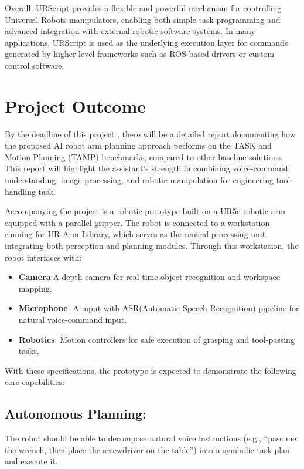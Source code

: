 \documentclass[12pt]{extarticle}
\begin{document}
Overall, URScript provides a flexible and powerful mechanism for controlling Universal Robots manipulators, enabling both simple task programming and advanced integration with external robotic software systems. In many applications, URScript is used as the underlying execution layer for commands generated by higher-level frameworks such as ROS-based drivers or custom control software.


\newpage
\section{Project Outcome}

By the deadline of this project , there will be a detailed report documenting how the proposed AI robot arm planning approach performs on the TASK and Motion Planning (TAMP) benchmarks, compared to other baseline solutions. This report will highlight the assistant's strength in combining voice-command understanding, image-processing, and robotic manipulation for engineering tool-handling task.

Accompanying the project is a robotic prototype built on a UR5e robotic arm equipped with a parallel gripper. The robot is connected to a workstation running for UR Arm Library, which serves as the central processing unit, integrating both perception and planning modules. Through this workstation, the robot interfaces with:

\begin{itemize}
    \item \textbf{Camera}:A depth camera for real-time object recognition and workspace mapping.
    \item \textbf{Microphone}: A input with ASR(Automatic Speech Recognition) pipeline for natural voice-command input.
    \item \textbf{Robotics}: Motion controllers for safe execution of grasping and tool-passing tasks. 
\end{itemize}

With these specifications, the prototype is expected to demonstrate the following core capabilities:

\subsection{Autonomous Planning:}

The robot should be able to decompose natural voice instructions (e.g., “pass me the wrench, then place the screwdriver on the table”) into a symbolic task plan and execute it.
\end{document}
